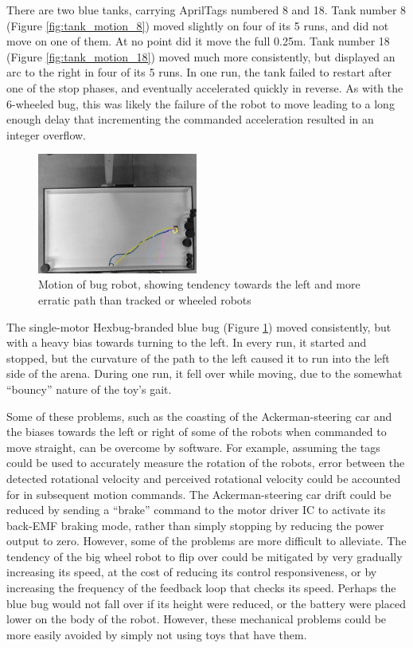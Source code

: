 There are two blue tanks, carrying AprilTags numbered 8 and 18. 
Tank number 8 (Figure \ref{fig:tank_motion_8}) moved slightly on four of its 5 runs, and did not move on one of them. 
At no point did it move the full 0.25m. 
Tank number 18 (Figure \ref{fig:tank_motion_18}) moved much more consistently, but displayed an arc to the right in four of its 5 runs. 
In one run, the tank failed to restart after one of the stop phases, and eventually accelerated quickly in reverse. 
As with the 6-wheeled bug, this was likely the failure of the robot to move leading to a long enough delay that incrementing the commanded acceleration resulted in an integer overflow. 

\begin{figure}[h]
	\centering
	\includegraphics[width=0.47\textwidth]{../hardwareX_paper/robot_5.png}
	\caption{Motion of bug robot, showing tendency towards the left and more erratic path than tracked or wheeled robots}
	\label{fig:bug_robot}
\end{figure}

The single-motor Hexbug-branded blue bug (Figure \ref{fig:bug_robot}) moved consistently, but with a heavy bias towards turning to the left. 
In every run, it started and stopped, but the curvature of the path to the left caused it to run into the left side of the arena. 
During one run, it fell over while moving, due to the somewhat ``bouncy'' nature of the toy's gait.

Some of these problems, such as the coasting of the Ackerman-steering car and the biases towards the left or right of some of the robots when commanded to move straight, can be overcome by software. 
For example, assuming the tags could be used to accurately measure the rotation of the robots, error between the detected rotational velocity and perceived rotational velocity could be accounted for in subsequent motion commands. 
The Ackerman-steering car drift could be reduced by sending a ``brake'' command to the motor driver IC to activate its back-EMF braking mode, rather than simply stopping by reducing the power output to zero. 
However, some of the problems are more difficult to alleviate. 
The tendency of the big wheel robot to flip over could be mitigated by very gradually increasing its speed, at the cost of reducing its control responsiveness, or by increasing the frequency of the feedback loop that checks its speed. 
Perhaps the blue bug would not fall over if its height were reduced, or the battery were placed lower on the body of the robot.
However, these mechanical problems could be more easily avoided by simply not using toys that have them. 

